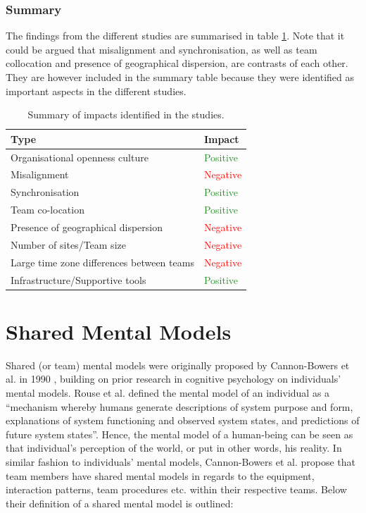 \subsubsection{Summary}

The findings from the different studies are summarised in table \ref{summary}. Note that it could be argued that misalignment and synchronisation, as well as team collocation and presence of geographical dispersion, are contrasts of each other. They are however included in the summary table because they were identified as important aspects in the different studies.

\begin{table}[H]
\begin{center}
    \begin{tabular}{ | p{8cm} | p{6cm} |}
    \hline
    \textbf{Type} & \textbf{Impact} \\ \hline
    Organisational openness culture & \textcolor{ForestGreen}{Positive} \\ \hline
    Misalignment & \textcolor{red}{Negative} \\ \hline
    Synchronisation & \textcolor{ForestGreen}{Positive} \\ \hline
    Team co-location & \textcolor{ForestGreen}{Positive} \\ \hline
    Presence of geographical dispersion & \textcolor{red}{Negative} \\ \hline
    Number of sites/Team size & \textcolor{red}{Negative} \\ \hline
    Large time zone differences between teams & \textcolor{red}{Negative} \\ \hline
    Infrastructure/Supportive tools & \textcolor{ForestGreen}{Positive} \\ \hline
    \end{tabular}
    \caption{Summary of impacts identified in the studies.}
    \label{summary}
\end{center}
\end{table}

\section{Shared Mental Models}

Shared (or team) mental models were originally proposed by Cannon-Bowers et al. in 1990 \cite{Cannon1990}, building on prior research in cognitive psychology on individuals’ mental models. Rouse et al. \cite{Rouse1986} defined the mental model of an individual as a ``mechanism whereby humans generate descriptions of system purpose and form, explanations of system functioning and observed system states, and predictions of future system states''. Hence, the mental model of a human-being can be seen as that individual's perception of the world, or put in other words, his reality. In similar fashion to individuals' mental models, Cannon-Bowers et al. propose that team members have shared mental models in regards to the equipment, interaction patterns, team procedures etc. within their respective teams. Below their definition of a shared mental model is outlined:

